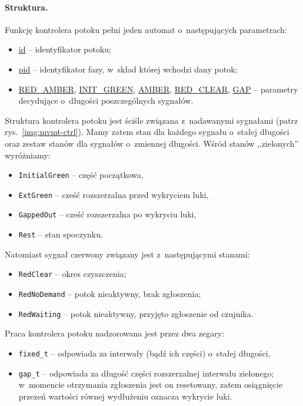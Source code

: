 \documentclass{pracamgr}
\newcommand{\imgr}[1]{rys.~\ref{#1}}
\theoremstyle{plain}
\begin{document}
\paragraph{Struktura.} Funkcję kontrolera potoku pełni jeden automat
o~następujących parametrach:
\begin{itemize}
  \item \url{id} -- identyfikator potoku;
  \item \url{pid} -- identyfikator fazy, w~skład której wchodzi dany potok;
  \item \url{RED_AMBER}, \url{INIT_GREEN}, \url{AMBER},
  \url{RED_CLEAR}, \url{GAP} -- parametry decydujące o~długości
  poszczególnych sygnałów.
\end{itemize}
Struktura kontrolera potoku jest ściśle związana z~nadawanymi
sygnałami (patrz \imgr{img:mvmt-ctrl}). Mamy zatem stan dla
każdego sygnału o~stałej długości oraz zestaw stanów dla
sygnałów o~zmiennej długości. Wśród stanów ,,zielonych''
wyróżniamy:
\begin{itemize}
  \item \texttt{InitialGreen} -- część początkowa,
  \item \texttt{ExtGreen} -- cześć rozszerzalna przed wykryciem luki,
  \item \texttt{GappedOut} -- cześć rozszerzalna po wykryciu luki,
  \item \texttt{Rest} -- stan spoczynku.
\end{itemize}
Natomiast sygnał czerwony związany jest z~następującymi stanami:
\begin{itemize}
  \item \texttt{RedClear} -- okres czyszczenia;
  \item \texttt{RedNoDemand} -- potok nieaktywny, brak zgłoszenia;
  \item \texttt{RedWaiting} -- potok nieaktywny, przyjęto zgłoszenie
  od czujnika.
\end{itemize}
Praca kontrolera potoku nadzorowana jest przez dwa zegary:
\begin{itemize}
  \item \texttt{fixed\_t} -- odpowiada za interwały (bądź ich części)
  o~stałej długości,
  \item \texttt{gap\_t} -- odpowiada za długość części rozszerzalnej
  interwału zielonego; w~momencie otrzymania zgłoszenia jest on
  resetowany, zatem osiągnięcie przezeń wartości równej wydłużeniu
  oznacza wykrycie luki.
\end{itemize}
\end{document}
